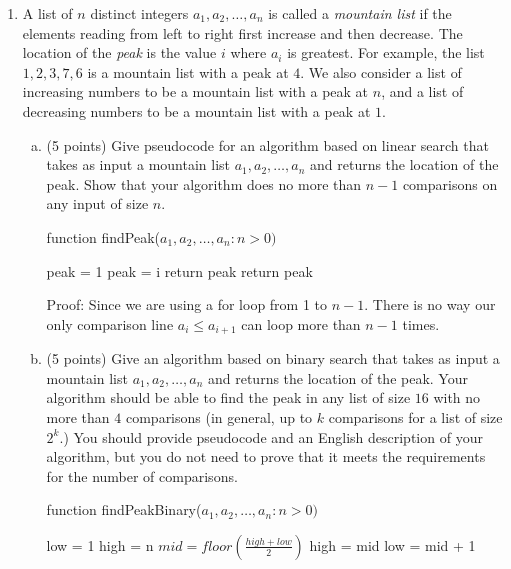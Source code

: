 \documentclass[11pt,letterpaper,unboxed,cm]{hmcpset}
\begin{document}
\begin{enumerate}



\item A list of $n$ distinct integers $a_1, a_2, \dots, a_n$ is called a {\em mountain list} if the elements reading from left to right first increase and then decrease. The location of the {\em peak} is the value $i$ where $a_i$ is greatest. For example, the list $1, 2, 3, 7, 6$ is a mountain list with a peak at $4$. We also consider a list of increasing numbers to be a mountain list with a peak at $n$, and a list of decreasing numbers to be a mountain list with a peak at $1$.

\begin{enumerate}[(a)]
\item (5 points) Give pseudocode for an algorithm based on linear search that takes as input a mountain list $a_1, a_2, \dots, a_n$ and returns the location of the peak. Show that your algorithm does no more than $n-1$ comparisons on any input of size $n$.

\bigskip
function findPeak($a_1, a_2, \dots, a_n : n > 0)$
\begin{algorithmic}
\STATE peak = 1
        \STATE peak = i
    \ELSE
        \STATE return peak
    \ENDIF
    \STATE return peak
\ENDFOR
\bigskip

Proof: Since we are using a for loop from 1 to $n-1$. There is no way our only comparison line $a_i \leq a_{i+1}$ can loop more than $n-1$ times.

\end{algorithmic}
\bigskip

\item (5 points) Give an algorithm based on binary search that takes as input a mountain list $a_1, a_2, \dots, a_n$ and returns the location of the peak. Your algorithm should be able to find the peak in any list of size $16$ with no more than $4$ comparisons (in general, up to $k$ comparisons for a list of size $2^k$.) You should provide pseudocode and an English description of your algorithm, but you do not need to prove that it meets the requirements for the number of comparisons.

\bigskip
function findPeakBinary($a_1, a_2, \dots, a_n : n > 0)$
\begin{algorithmic}
\STATE low = 1
\STATE high = n
    \STATE $\displaystyle mid = floor(\frac{high + low}{2})$
        \STATE high = mid
    \ELSE
        \STATE low = mid + 1
    \ENDIF
\ENDWHILE
\bigskip


\end{algorithmic}
\end{enumerate}
\end{enumerate}
\end{document}
